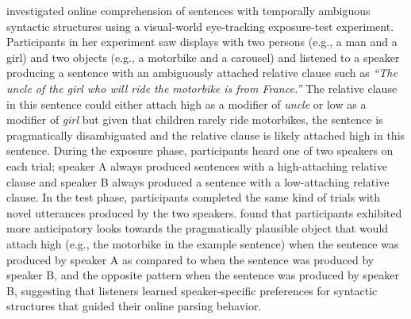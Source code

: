 \textcite{Kamide2012} investigated online comprehension of sentences with temporally ambiguous syntactic structures using a visual-world eye-tracking exposure-test experiment. 
Participants in her experiment saw displays with two persons (e.g., a man and a girl) and two objects (e.g., a motorbike and a carousel) and listened to a speaker producing
a sentence with an ambiguously attached relative clause such as \textit{``The uncle of the girl who will ride the motorbike is from France.''} The relative clause in this sentence could
either attach high as a modifier of \textit{uncle} or low as a modifier of \textit{girl} but given that children rarely ride motorbikes, the sentence is pragmatically disambiguated and the
relative clause is likely attached high in this sentence. During the exposure phase, participants heard one of two speakers on each trial; speaker A always produced sentences with 
a high-attaching relative clause and speaker B always produced a sentence with a low-attaching relative clause. In the test phase, participants completed the same kind of trials with 
novel utterances produced by the two speakers. \textcite{Kamide2012} found that participants exhibited more anticipatory looks towards the pragmatically plausible object that would attach
high (e.g., the motorbike in the example sentence) when the sentence was produced by speaker A as compared to when the sentence was produced by speaker B, and the opposite pattern when
the sentence was produced by speaker B, suggesting that listeners learned speaker-specific preferences for syntactic structures that guided their online parsing behavior. 

